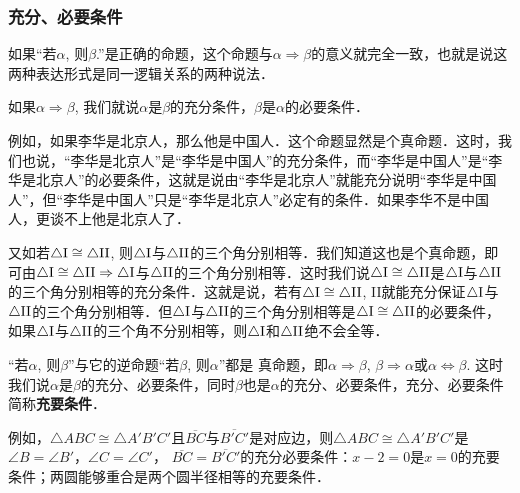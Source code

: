 \subsubsection{充分、必要条件}

如果“若$\alpha$, 则$\beta$.”是正确的命题，这个命题与$\alpha\Rightarrow\beta$的意义就完全一致，也就是说这两种表达形式是同一逻辑关系的两种说法．

\begin{blk}{}
	如果$\alpha\Rightarrow\beta$, 我们就说$\alpha$是$\beta$的充分条件，$\beta$是$\alpha$的必要条件．  
\end{blk}

例如，如果李华是北京人，那么他是中国人．这个命题显然是个真命题．这时，我们也说，“李华是北京人”是“李华是中国人”的充分条件，而“李华是中国人”是“李华是北京人”的必要条件，这就是说由“李华是北京人”就能充分说明“李华是中国人”，但“李华是中国人”只是“李华是北京人”必定有的条件．如果李华不是中国人，更谈不上他是北京人了．

又如若$\triangle {\rm I}\cong \triangle {\rm II}$, 则$\triangle {\rm I}$与$\triangle {\rm II}$的三个角分别相等．我们知道这也是个真命题，即可由$\triangle {\rm I}\cong \triangle {\rm II}\Rightarrow \triangle {\rm I}$与$\triangle {\rm II}$的三个角分别相等．这时我们说$\triangle {\rm I}\cong \triangle {\rm II}$是$\triangle {\rm I}$与$\triangle {\rm II}$的三个角分别相等的充分条件．这就是说，若有$\triangle {\rm I}\cong\triangle {\rm II}$, II就能充分保证$\triangle {\rm I}$与$\triangle {\rm II}$的三个角分别相等．但$\triangle {\rm I}$与$\triangle {\rm II}$的三个角分别相等是$\triangle {\rm I}\cong \triangle {\rm II}$的必要条件，如果$\triangle {\rm I}$与$\triangle {\rm II}$的三个角不分别相等，则$\triangle {\rm I}$和$\triangle {\rm II}$绝不会全等．

“若$\alpha$, 则$\beta$”与它的逆命题“若$\beta$, 则$\alpha$”都是
真命题，即$\alpha\Rightarrow\beta$, $\beta\Rightarrow\alpha$或$\alpha\Leftrightarrow\beta$. 这时我们说$\alpha$是$\beta$的充分、必要条件，同时$\beta$也是$\alpha$的充分、必要条件，充分、必要条件简称\textbf{充要条件}．

例如，$\triangle ABC\cong \triangle A'B'C'$且$\overline{BC}$与$\overline{B'C'}$是对应边，则$\triangle ABC\cong \triangle A'B'C'$是
$\angle B=\angle B'$，$\angle C=\angle C'$，
$\overline{BC}=\overline{B'C'}$的充分必要条件：$x-2=0$是$x=0$的充要条件；两圆能够重合是两个圆半径相等的充要条件．

